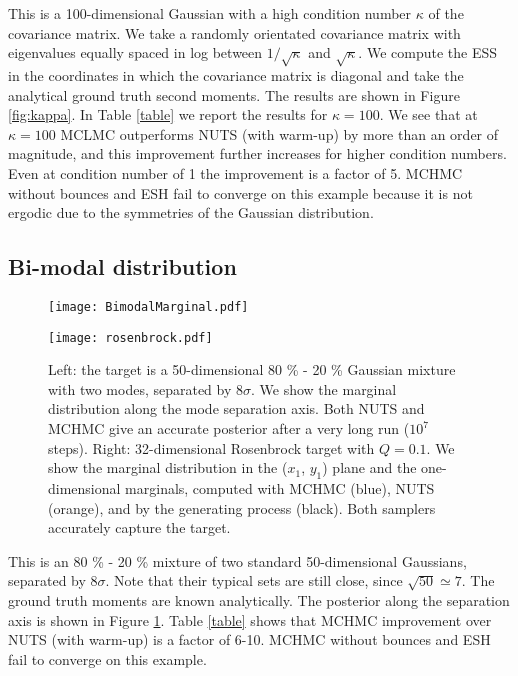 \documentclass[twoside,11pt]{article}
\begin{document}
    This  is a 100-dimensional Gaussian with a high condition number $\kappa$ of the covariance matrix. We take a randomly orientated covariance matrix with eigenvalues equally spaced in log between $1/\sqrt{\kappa}$ and $\sqrt{\kappa}$. 
    We compute the ESS in the coordinates in which the covariance matrix is diagonal and take the analytical ground truth second moments. The results are shown in Figure \ref{fig:kappa}. In Table \ref{table} we report the results for $\kappa = 100$. We see that at $\kappa=100$ MCLMC outperforms NUTS (with warm-up) by more than an order of magnitude, and this improvement 
    further increases for higher 
    condition numbers. Even at 
    condition number of 1 the improvement  is a factor of 5. 
    MCHMC without bounces and ESH fail to converge
    on this example because it is 
    not ergodic due to the symmetries
    of the Gaussian distribution.
    
    
    
\subsection{Bi-modal distribution} 
        
    \begin{figure}
        \centering
        \begin{minipage}{0.45\textwidth}
            \hspace*{-1cm}\texttt{[image: BimodalMarginal.pdf]}
        \end{minipage}
        \begin{minipage}{0.45\textwidth}
            \hspace*{1.7cm}\texttt{[image: rosenbrock.pdf]}
        \end{minipage}
        \caption{Left: the target is a 50-dimensional 80 \% - 20 \% Gaussian mixture with two modes, separated by $8 \sigma$. We show the marginal distribution along the mode separation axis. Both NUTS and MCHMC give an accurate posterior after a very long run ($10^7$ steps).
        Right: 32-dimensional Rosenbrock target with $Q = 0.1$. We show the marginal distribution in the ($x_1$, $y_1$) plane and the one-dimensional marginals, computed with MCHMC (blue), NUTS (orange), and by the generating process (black). Both samplers accurately capture the target.}
        \label{fig:rosenbrock}
    \end{figure}
    
    This is an 80 \% - 20 \% mixture of two standard 50-dimensional Gaussians, separated by $8 \sigma$. Note that their typical sets are still close, since $\sqrt{50}\simeq 7$. The ground truth moments are known analytically. The posterior along the separation axis is shown in Figure \ref{fig:rosenbrock}. Table \ref{table} shows that MCHMC improvement over NUTS (with warm-up) is a factor of 6-10.
    MCHMC without bounces and ESH fail to converge
    on this example.
    
\end{document}
